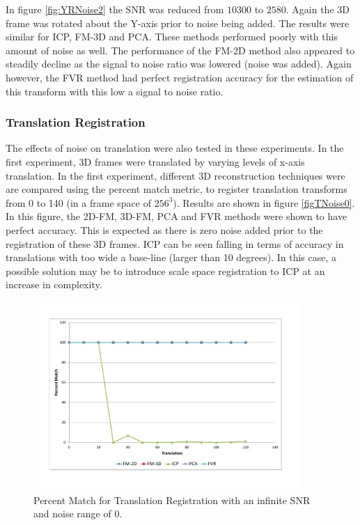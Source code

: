 In figure \ref{fig:YRNoise2} the SNR was reduced from $10300$ to $2580$. Again the 3D frame was rotated about the Y-axis prior to noise being added. The results were similar for ICP, FM-3D and PCA. These methods performed poorly with this amount of noise as well. The performance of the FM-2D method also appeared to steadily decline as the signal to noise ratio was lowered (noise was added). Again however, the FVR method had perfect registration accuracy for the estimation of this transform with this low a signal to noise ratio. \\

\subsubsection{Translation Registration}

The effects of noise on translation were also tested in these experiments. In the first experiment, 3D frames were translated by varying levels of x-axis translation. In the first experiment, different 3D reconstruction techniques were are compared using the percent match metric, to register translation transforms from 0 to 140 (in a frame space of $256^3$). Results are shown in figure \ref{figTNoise0}. In this figure, the 2D-FM, 3D-FM, PCA and FVR methods were shown to have perfect accuracy. This is expected as there is zero noise added prior to the registration of these 3D frames. ICP can be seen falling in terms of accuracy in translations with too wide a base-line (larger than 10 degrees). In this case, a possible solution may be to introduce scale space registration to ICP at an increase in complexity. \\  

\begin{figure}[!htb]
\centering
\includegraphics[width=4.0in]{images/results/noise/TransNoise0}
\caption{Percent Match for Translation Registration with an infinite SNR and noise range of $0$.}
\label{fig:TNoise0}
\end{figure}


